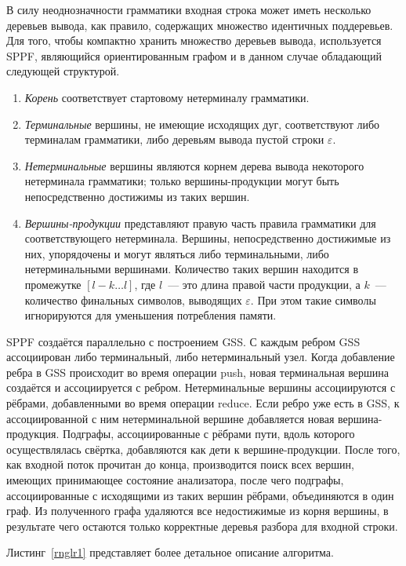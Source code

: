 В силу неоднозначности грамматики входная строка может иметь несколько деревьев вывода, как правило, содержащих множество идентичных поддеревьев. Для того, чтобы компактно хранить множество деревьев вывода, используется SPPF, являющийся ориентированным графом и в данном случае обладающий следующей структурой.
\begin{enumerate}
  \item \emph{Корень} соответствует стартовому нетерминалу грамматики.
  \item \emph{Терминальные} вершины, не имеющие исходящих дуг, соответствуют либо терминалам грамматики, либо деревьям вывода пустой строки $\varepsilon$.
  \item \emph{Нетерминальные} вершины являются корнем дерева вывода некоторого нетерминала грамматики; только вершины-продукции могут быть непосредственно достижимы из таких вершин.
  \item \emph{Вершины-продукции} представляют правую часть правила грамматики для соответствующего нетерминала. Вершины, непосредственно достижимые из них, упорядочены и могут являться либо терминальными, либо нетерминальными вершинами. Количество таких вершин находится в промежутке $[l-k \dots l]$, где $l$~--- это длина правой части продукции, а $k$~--- количество финальных символов, выводящих $\varepsilon$. При этом такие символы игнорируются для уменьшения потребления памяти.
\end{enumerate}

SPPF создаётся параллельно с построением GSS. С каждым ребром GSS ассоциирован либо терминальный, либо нетерминальный узел. Когда добавление ребра в GSS происходит во время операции push, новая терминальная вершина создаётся и ассоциируется с ребром. Нетерминальные вершины ассоциируются с рёбрами, добавленными во время операции reduce. Если ребро уже есть в GSS, к ассоциированной с ним нетерминальной вершине добавляется новая вершина-продукция. Подграфы, ассоциированные с рёбрами пути, вдоль которого осуществлялась свёртка, добавляются как дети к вершине-продукции. После того, как входной поток прочитан до конца, производится поиск всех вершин, имеющих принимающее состояние анализатора, после чего подграфы, ассоциированные с исходящими из таких вершин рёбрами, объединяются в один граф. Из полученного графа удаляются все недостижимые из корня вершины, в результате чего остаются только корректные деревья разбора для входной строки. 

Листинг~\ref{rnglr1} представляет более детальное описание алгоритма.


